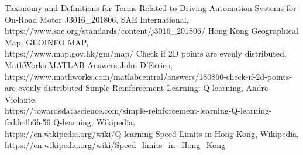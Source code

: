 \documentclass[12pt]{article}
\newcommand{\wholepages}{18}
\theoremstyle{definition}
\theoremstyle{remark}
\numberwithin{equation}{section}
\begin{document}
	
	\newpage
	\thispagestyle{empty}
	\renewcommand\refname{References}
	\clearpage
	\begin{thebibliography}{100}
		 Taxonomy and Definitions for Terms Related to Driving Automation Systems for On-Road Motor J3016\_201806, SAE International,\\ https://www.sae.org/standards/content/j3016\_201806/
		 Hong Kong Geographical Map, GEOINFO MAP,\\ https://www.map.gov.hk/gm/map/
		 Check if 2D points are evenly distributed, MathWorks MATLAB Answers John D'Errico,\\ https://www.mathworks.com/matlabcentral/answers/180860-check-if-2d-points-are-evenly-distributed
		 Simple Reinforcement Learning: Q-learning, Andre Violante,\\ https://towardsdatascience.com/simple-reinforcement-learning-Q-learning-fcddc4b6fe56
		 Q-learning, Wikipedia,\\ https://en.wikipedia.org/wiki/Q-learning
		 Speed Limits in Hong Kong, Wikipedia,\\https://en.wikipedia.org/wiki/Speed\_limits\_in\_Hong\_Kong
	\end{thebibliography} 
	
\end{document}
